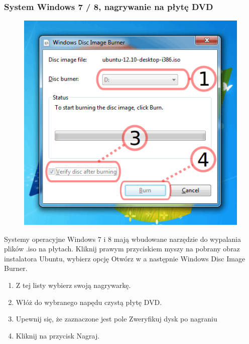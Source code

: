 \subsubsection{System Windows 7 / 8, nagrywanie na płytę DVD}
\begin{figure}
                \includegraphics[width=\linewidth]{images/instalacja_nagrywanie_obrazu_DVD.png}
\end{figure}

Systemy operacyjne Windows 7 i 8 mają wbudowane narzędzie do wypalania plików .iso na płytach. Kliknij prawym przyciskiem myszy na pobrany obraz instalatora Ubuntu, wybierz opcję \textcolor{ubuntu_orange}{Otwórz w} a następnie \textcolor{ubuntu_orange}{Windows Disc Image Burner}.
\begin{enumerate}[label=\protect\circled{\arabic*}]
\item Z tej listy wybierz swoją nagrywarkę.
\item Włóż do wybranego napędu czystą płytę DVD.
\item Upewnij się, że zaznaczone jest pole \textcolor{ubuntu_orange}{Zweryfikuj dysk po nagraniu}
\item Kliknij na przycisk \textcolor{ubuntu_orange}{Nagraj}.
\end{enumerate}
\clearpage

